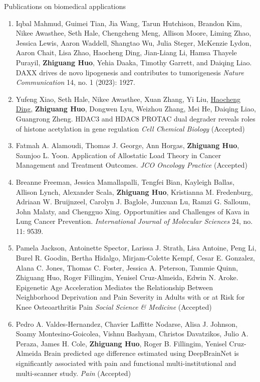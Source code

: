 \documentclass{resume} %
\begin{document}
\begin{rSection}{Publications on biomedical applications}
\begin{enumerate}[noitemsep,topsep=0pt, resume]
\item
Iqbal Mahmud, Guimei Tian, Jia Wang, Tarun Hutchison, Brandon Kim, Nikee Awasthee, Seth Hale, Chengcheng Meng, Allison Moore, Liming Zhao, Jessica Lewis, Aaron Waddell, Shangtao Wu, Julia Steger, McKenzie Lydon, Aaron Chait, Lisa Zhao, Haocheng Ding, Jian-Liang Li, Hamsa Thayele Purayil, {\bf Zhiguang Huo}, Yehia Daaka, Timothy Garrett, and Daiqing Liao.
DAXX drives de novo lipogenesis and contributes to tumorigenesis
\emph{Nature Communication} 14, no. 1 (2023): 1927.

\item Yufeng Xiao, Seth Hale,  Nikee Awasthee,  Xuan Zhang,  Yi Liu,  \underline{Haocheng Ding}, {\bf Zhiguang Huo}, Dongwen Lyu,  Weizhou Zhang, Mei He, Daiqing Liao, Guangrong Zheng.
HDAC3 and HDAC8 PROTAC dual degrader reveals roles of histone acetylation in gene regulation
\emph{Cell Chemical Biology} (Accepted)


\item
Fatmah A. Alamoudi, Thomas J. George, Ann Horgas, {\bf Zhiguang Huo}, Saunjoo L. Yoon.  
Application of Allostatic Load Theory in Cancer Management and Treatment Outcomes.
\emph{JCO Oncology Practice} (Accepted)



\item
Breanne Freeman, Jessica Mamallapalli, Tengfei Bian, Kayleigh Ballas, Allison Lynch, Alexander Scala, {\bf Zhiguang Huo}, Kristianna M. Fredenburg, Adriaan W. Bruijnzeel, Carolyn J. Baglole, Junxuan Lu, Ramzi G. Salloum, John Malaty, and Chengguo Xing. 
Opportunities and Challenges of Kava in Lung Cancer Prevention.
\emph{ International Journal of Molecular Sciences} 24, no. 11: 9539.


\item 
Pamela Jackson, Antoinette Spector, Larissa J. Strath, Lisa Antoine, Peng Li, Burel R. Goodin, Bertha Hidalgo, Mirjam-Colette Kempf, Cesar E. Gonzalez, Alana C. Jones, Thomas C. Foster, Jessica A. Peterson, Tammie Quinn, Zhiguang Huo, Roger Fillingim, Yenisel Cruz-Almeida, Edwin N. Aroke.
Epigenetic Age Acceleration Mediates the Relationship Between Neighborhood Deprivation and Pain Severity in Adults with or at Risk for Knee Osteoarthritis Pain
\emph{Social Science \& Medicine} (Accepted)
 

\item 

Pedro A. Valdes-Hernandez, Chavier Laffitte Nodarse, Alisa J. Johnson, Soamy  Montesino-Goicolea, Vishnu Bashyam, Christos Davatzikos, Julio A. Peraza, James H. Cole, {\bf Zhiguang Huo}, Roger B. Fillingim, Yenisel Cruz-Almeida
Brain predicted age difference estimated using DeepBrainNet is significantly associated with pain and functional multi-institutional and multi-scanner study.
\emph{Pain} (Accepted)





\end{enumerate}
\end{rSection}
\end{document}
